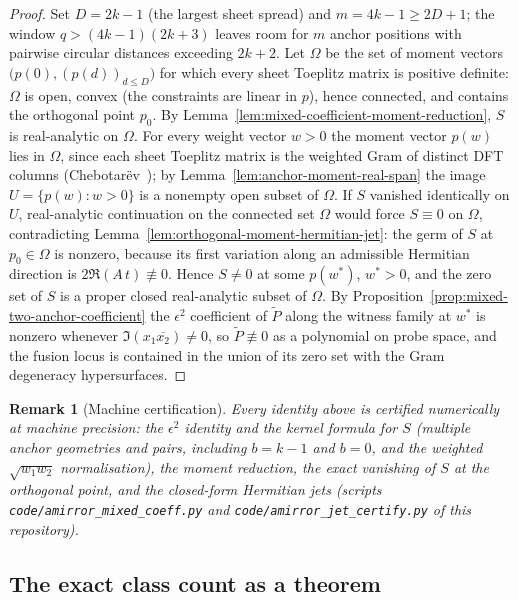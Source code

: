 \documentclass[11pt]{article}
\newtheorem{remark}{Remark}
\begin{document}
\begin{proof}
Set $D=2k-1$ (the largest sheet spread) and $m=4k-1\ge2D+1$; the window $q>(4k-1)(2k+3)$ leaves
room for $m$ anchor positions with pairwise circular distances exceeding $2k+2$.
Let $\Omega$ be the set of moment vectors $\bigl(p(0),(p(d))_{d\le D}\bigr)$ for which every sheet
Toeplitz matrix is positive definite: $\Omega$ is open, convex (the constraints are linear in $p$),
hence connected, and contains the orthogonal point $p_0$.
By Lemma~\ref{lem:mixed-coefficient-moment-reduction}, $S$ is real-analytic on $\Omega$.
For every weight vector $w>0$ the moment vector $p(w)$ lies in $\Omega$, since each sheet Toeplitz
matrix is the weighted Gram of distinct DFT columns (Chebotar\"ev~\cite{EvansIsaacs1976}); by
Lemma~\ref{lem:anchor-moment-real-span} the image $U=\{p(w):w>0\}$ is a nonempty open subset of
$\Omega$.
If $S$ vanished identically on $U$, real-analytic continuation on the connected set $\Omega$ would
force $S\equiv0$ on $\Omega$, contradicting Lemma~\ref{lem:orthogonal-moment-hermitian-jet}: the
germ of $S$ at $p_0\in\Omega$ is nonzero, because its first variation along an admissible Hermitian
direction is $2\Re(A\,t)\not\equiv0$.
Hence $S\neq0$ at some $p(w^\ast)$, $w^\ast>0$, and the zero set of $S$ is a proper closed
real-analytic subset of $\Omega$.
By Proposition~\ref{prop:mixed-two-anchor-coefficient} the $\epsilon^2$ coefficient of
$\widetilde P$ along the witness family at $w^\ast$ is nonzero whenever $\Im(x_1\overline{x_2})
\neq0$, so $\widetilde P\not\equiv0$ as a polynomial on probe space, and the fusion locus is
contained in the union of its zero set with the Gram degeneracy hypersurfaces.
\end{proof}

\begin{remark}[Machine certification]
\label{rem:amirror-certification}
Every identity above is certified numerically at machine precision: the $\epsilon^2$ identity and
the kernel formula for $S$ (multiple anchor geometries and pairs, including $b=k-1$ and $b=0$, and
the weighted $\sqrt{w_1w_2}$ normalisation), the moment reduction, the exact vanishing of $S$ at the
orthogonal point, and the closed-form Hermitian jets (scripts \texttt{code/amirror\_mixed\_coeff.py} and
\texttt{code/amirror\_jet\_certify.py} of this repository).
\end{remark}

\subsection{The exact class count as a theorem}
\label{sec:v3-count-theorem}
\end{document}
